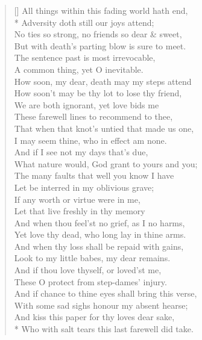 \documentclass[MAIN]{subfiles}
\begin{document}
\settowidth{\versewidth}{All things within this fading world hath end,}
\begin{verse}[\versewidth]
All things within this fading world hath end,\\*
Adversity doth still our joys attend;\\
No ties so strong, no friends so dear \& sweet,\\
But with death's parting blow is sure to meet.\\
The sentence past is most irrevocable,\\
A common thing, yet O inevitable.\\
How soon, my dear, death may my steps attend\\  
How soon't may be thy lot to lose thy friend,\\
We are both ignorant, yet love bids me\\
These farewell lines to recommend to thee,\\
That when that knot's untied that made us one,\\
I may seem thine, who in effect am none.\\
And if I see not  my days that's due,\\
What nature would, God grant to yours and you;\\
The many faults that well you know I have\\
Let be interred in my oblivious grave;\\
If any worth or virtue were in me,\\
Let that live freshly in thy memory\\
And when thou feel'st no grief, as I no harms,\\
Yet love thy dead, who long lay in thine arms.\\
And when thy loss shall be repaid with gains,\\
Look to my little babes, my dear remains.\\
And if thou love thyself, or loved'st me,\\
These O protect from step-dames' injury.\\
And if chance to thine eyes shall bring this verse,\\
With some sad sighs honour my absent hearse;\\
And kiss this paper for thy loves dear sake,\\*
Who with salt tears this last farewell did take.
\end{verse}
\end{document}
